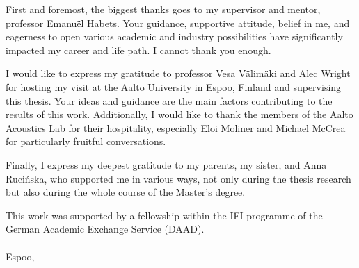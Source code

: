 First and foremost, the biggest thanks goes to my supervisor and mentor, professor Emanu{\"e}l Habets. Your guidance, supportive attitude, belief in me, and eagerness to open various academic and industry possibilities have significantly impacted my career and life path. I cannot thank you enough.

I would like to express my gratitude to professor Vesa V{\"a}lim{\"a}ki and Alec Wright for hosting my visit at the Aalto University in Espoo, Finland and supervising this thesis. Your ideas and guidance are the main factors contributing to the results of this work. Additionally, I would like to thank the members of the Aalto Acoustics Lab for their hospitality, especially Eloi Moliner and Michael McCrea for particularly fruitful conversations.

Finally, I express my deepest gratitude to my parents, my sister, and Anna Rucińska, who supported me in various ways, not only during the thesis research but also during the whole course of the Master's degree.

This work was supported by a
fellowship within the IFI programme of the German Academic Exchange
Service (DAAD).
\\
\\

Espoo, \myTime \\
\begin{flushright}
    \myName
\end{flushright}


\clearpage